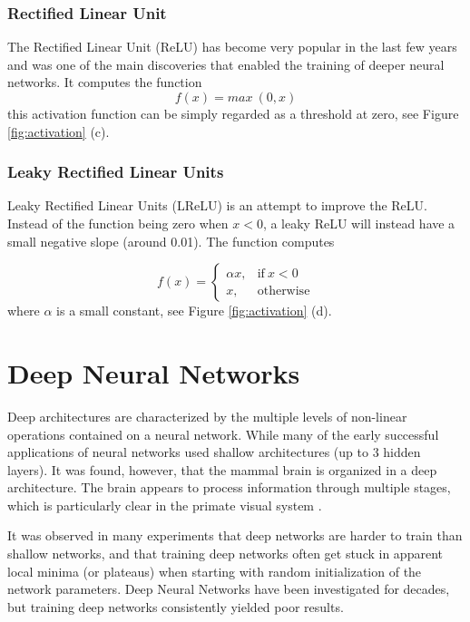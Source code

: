 \subsubsection{Rectified Linear Unit}

The Rectified Linear Unit (ReLU) has become very popular in the last few years and was one of the main discoveries that enabled the training of deeper neural networks. It computes the function 
\begin{equation}
f(x)=max \: (0,x)
\label{eq:relu}
\end{equation}
this activation function can be simply regarded as a threshold at zero, see Figure \ref{fig:activation} (c). 

\subsubsection{Leaky Rectified Linear Units}

Leaky Rectified Linear Units (LReLU) is an attempt to improve the ReLU. Instead of the function being zero when $x < 0$, a leaky ReLU will instead have a small negative slope (around 0.01). The function computes

\begin{equation}
f(x)=\begin{cases}
      \alpha x, & \text{if}\ x < 0\\
      x, & \text{otherwise}
    \end{cases}
\label{eq:lrelu}
\end{equation} where $\alpha$ is a small constant, see Figure \ref{fig:activation} (d). 


\section{Deep Neural Networks}
Deep architectures are characterized by the multiple levels of non-linear operations
contained on a neural network. While many of the early successful applications of neural networks used shallow architectures (up to 3 hidden layers). It was found, however, that the mammal brain is organized in a deep architecture. The brain appears to process information through multiple stages, which is particularly clear in the primate visual system \cite{bengio2009learning}. 

It was observed in many experiments that deep networks are harder to train than shallow networks, and that training deep networks often get stuck in apparent local minima (or plateaus) when starting with random initialization of the network parameters. Deep Neural Networks have been investigated for decades, but training deep networks consistently yielded poor results. 

